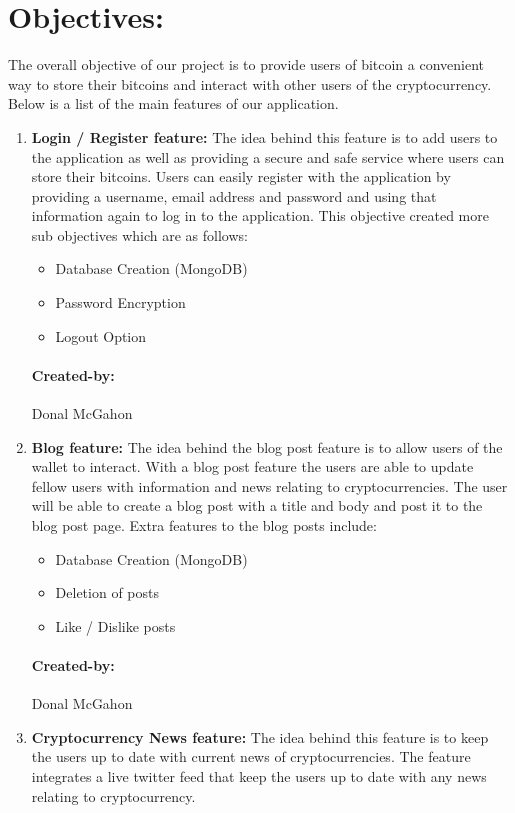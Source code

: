 \section{Objectives:}
The overall objective of our project is to provide users of bitcoin a convenient way to store their bitcoins and interact with other users of the cryptocurrency. Below is a list of the main features of our application.

\begin{enumerate}

\item \textbf{Login / Register feature:}
The idea behind this feature is to add users to the application as well as providing a secure and safe service where users can store their bitcoins. Users can easily register with the application by providing a username, email address and password and using that information again to log in to the application. This objective created more sub objectives which are as follows:
    \begin{itemize}
        \item Database Creation (MongoDB)
        \item Password Encryption
        \item Logout Option
    \end{itemize}
    \paragraph{Created-by:} Donal McGahon

\item \textbf{Blog feature:}
The idea behind the blog post feature is to allow users of the wallet to interact. With a blog post feature the users are able to update fellow users with information and news relating to cryptocurrencies. The user will be able to create a blog post with a title and body and post it to the blog post page. Extra features to the blog posts include:
    \begin{itemize}
        \item Database Creation (MongoDB)
        \item Deletion of posts
        \item Like / Dislike posts
    \end{itemize}
    \paragraph{Created-by:} Donal McGahon

\item \textbf{Cryptocurrency News feature:}
The idea behind this feature is to keep the users up to date with current news of cryptocurrencies. The feature integrates a live twitter feed that keep the users up to date with any news relating to cryptocurrency.

\end{enumerate}

